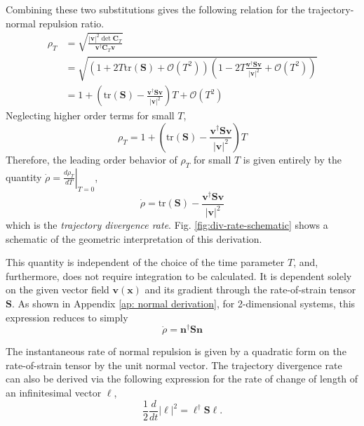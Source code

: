 \documentclass[twocolumn]{svjour3}
\begin{document}
Combining these two substitutions gives the following relation for the trajectory-normal repulsion ratio.
\begin{equation}
\begin{aligned}
\rho_T  &= \sqrt{\frac{
| \mathbf{v} |^2 \det\mathbf{C}_T }{
\mathbf{v} ^\dagger\mathbf{C}_T  \mathbf{v} 
}} \\
&= \sqrt{\left(1 + 2T\text{tr}\left(\mathbf{S}\right)+\mathcal{O}(T^2)\right)\left(1-2T \frac{\mathbf{v} ^\dagger\mathbf{S} \mathbf{v} }{\left|\mathbf{v} \right|^2}+\mathcal{O}(T^2)\right)} \\
&= 1+\left(\text{tr}(\mathbf{S} )-\frac{\mathbf{v} ^\dagger \mathbf{S} \mathbf{v} }{\left|\mathbf{v} \right|^2}\right)T + \mathcal{O}(T^2)
\end{aligned}
\end{equation}
Neglecting higher order terms for small $T$, 
\begin{equation}
\rho_T  = 1+\left(\text{tr}(\mathbf{S} )-\frac{\mathbf{v} ^\dagger \mathbf{S} \mathbf{v} }{\left|\mathbf{v} \right|^2}\right)T
\label{eq:local Rho}
\end{equation}
Therefore, the leading order behavior of \(\rho_T \) for small $T$ is given entirely by the quantity $\dot \rho = \left.\frac{d \rho_T}{dT}\right|_{T=0}$,
\begin{equation}
\dot \rho   = \text{tr}(\mathbf{S} )-\frac{\mathbf{v} ^\dagger \mathbf{S} \mathbf{v} }{\left|\mathbf{v} \right|^2}
\label{eq:Leading Order Behavior}
\end{equation}
which is the {\it trajectory divergence rate}. Fig. \ref{fig:div-rate-schematic} shows a schematic of the geometric interpretation of this derivation.

This quantity is independent of the choice of the time parameter \(T\), and, furthermore, does not require integration to be calculated. It is dependent solely on the given vector field $\mathbf{v}(\mathbf{x})$	and its gradient through the rate-of-strain tensor
$\mathbf{S} $. As shown in Appendix \ref{ap: normal derivation}, for 2-dimensional systems, this expression reduces to simply
\begin{equation}
\dot{\rho}  = \mathbf{n}^\dagger\mathbf{S} \mathbf{n}
\label{eq:DivRate}
\end{equation}

The instantaneous rate of normal repulsion is given by a quadratic form on the  rate-of-strain tensor by the unit normal vector. The trajectory divergence rate can also be derived via the following expression for the rate of change of length of an infinitesimal vector $\ell$,
\begin{equation}
\frac{1}{2}\frac{d}{dt}\left|\ell\right|^2 = \ell^\dagger\mathbf{S}\ell.
\end{equation}
\end{document}

